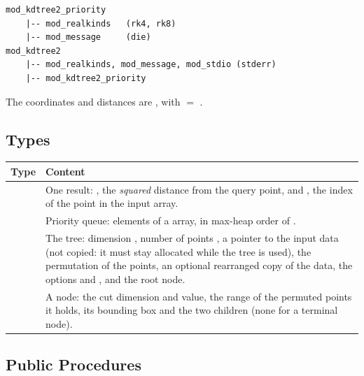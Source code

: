 \begin{lstlisting}
mod_kdtree2_priority
    |-- mod_realkinds   (rk4, rk8)
    |-- mod_message     (die)
mod_kdtree2
    |-- mod_realkinds, mod_message, mod_stdio (stderr)
    |-- mod_kdtree2_priority
\end{lstlisting}

The coordinates and distances are , with 
$=$ .

\subsection{Types}

\begin{longtable}{L{3.5cm} L{10.5cm}}
  \toprule
  \textbf{Type} & \textbf{Content} \\
  \midrule
  \endhead
  \bottomrule
  \endfoot
   &
    One result: , the \emph{squared} distance from the query
    point, and , the index of the point in the input array. \\
   &
    Priority queue:  elements of a 
    array, in max-heap order of . \\
   &
    The tree: dimension , number of points , a pointer
    to the input data  (not copied: it must
    stay allocated while the tree is used), the permutation  of
    the points, an optional rearranged copy of the data, the options
     and , and the root node. \\
   &
    A node: the cut dimension and value, the range  of the
    permuted points it holds, its bounding box and the two children (none
    for a terminal node). \\
\end{longtable}

\subsection{Public Procedures}

